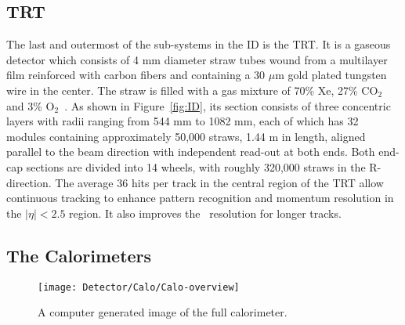 			\subsection*{TRT}
			 
				The last and outermost of the sub-systems in the ID is the TRT. It is a gaseous detector which consists of 4 mm diameter straw tubes wound from a multilayer film reinforced with carbon fibers and containing a 30 $\mu$m gold plated tungsten wire in the center. The straw is filled with a gas mixture of 70\% Xe, 27\% CO$_2$ and 3\% O$_2$~\cite{TRT2012}. As shown in Figure~\ref{fig:ID}, its section consists of three concentric layers with radii ranging from 544 mm to 1082 mm, each of which has 32 modules containing approximately 50,000 straws, 1.44 m in length, aligned parallel to the beam direction with independent read-out at both ends. Both end-cap sections are divided into 14 wheels, with roughly 320,000 straws in the R-direction. The average 36 hits per track in the central region of the TRT allow continuous tracking to enhance pattern recognition and momentum resolution in the $\left| \eta \right| < 2.5$ region. It also improves the \pt\ resolution for longer tracks.



		\subsection{The Calorimeters}

			\begin{figure}[!htb]
				\centering
				\texttt{[image: Detector/Calo/Calo-overview]}
				\caption{A computer generated image of the full calorimeter.}
				\label{fig:Calo}
			\end{figure}

